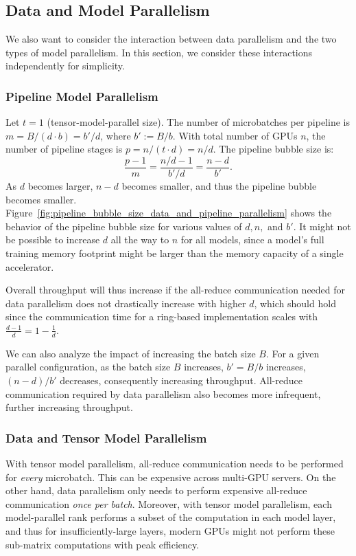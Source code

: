 \subsection{Data and Model Parallelism}
\label{sec:data_and_model_parallelism_analytical_model}

We also want to consider the interaction between data parallelism and the two types of model parallelism. In this section, we consider these interactions independently for simplicity.

\subsubsection{Pipeline Model Parallelism} Let $t=1$ (tensor-model-parallel size). The number of microbatches per pipeline is $m = B / (d \cdot b)=b'/d$, where $b':=B/b$. With total number of GPUs $n$, the number of pipeline stages is $p=n/(t\cdot d)=n/d$. The pipeline bubble size is:$$\frac{p-1}{m} = \dfrac{n/d-1}{b'/d} = \dfrac{n-d}{b'}.$$
As $d$ becomes larger, $n-d$ becomes smaller, and thus the pipeline bubble becomes smaller. Figure~\ref{fig:pipeline_bubble_size_data_and_pipeline_parallelism} shows the behavior of the pipeline bubble size for various values of $d, n,$ and $b'$. It might not be possible to increase $d$ all the way to $n$ for all models, since a model's full training memory footprint might be larger than the memory capacity of a single accelerator.

Overall throughput will thus increase if the all-reduce communication needed for data parallelism does not drastically increase with higher $d$, which should hold since the communication time for a ring-based implementation scales with $\frac{d-1}{d} = 1 - \frac{1}{d}$.

We can also analyze the impact of increasing the batch size $B$. For a given parallel configuration, as the batch size $B$ increases, $b'=B/b$ increases, $(n-d)/b'$ decreases, consequently increasing throughput. All-reduce communication required by data parallelism also becomes more infrequent, further increasing throughput.

\subsubsection{Data and Tensor Model Parallelism} With tensor model parallelism, all-reduce communication needs to be performed for \emph{every} microbatch. This can be expensive across multi-GPU servers. On the other hand, data parallelism only needs to perform expensive all-reduce communication \emph{once per batch}. Moreover, with tensor model parallelism, each model-parallel rank performs a subset of the computation in each model layer, and thus for insufficiently-large layers, modern GPUs might not perform these sub-matrix computations with peak efficiency.

